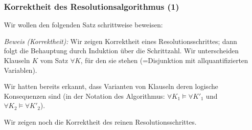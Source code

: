 \documentclass[aspectratio=1610,onlymath]{beamer}
\begin{document}
\begin{frame}\frametitle{Korrektheit des Resolutionsalgorithmus (1)}

Wir wollen den folgenden Satz schrittweise beweisen:

\pause

\emph{Beweis (Korrektheit):} Wir zeigen Korrektheit eines Resolutionsschrittes; dann folgt die Behauptung durch Induktion über die Schrittzahl. Wir unterscheiden Klauseln $K$ vom Satz
$\forall K$, für den sie stehen (=Disjunktion mit allquantifizierten Variablen).
\bigskip

Wir hatten bereits erkannt, dass Varianten von Klauseln deren logische Konsequenzen sind (in der Notation des Algorithmus: $\forall K_1\models \forall K'_1$ und $\forall K_2\models \forall K'_2$).\bigskip

Wir zeigen noch die Korrektheit des reinen Resolutionsschrittes.

\end{frame}
\end{document}
